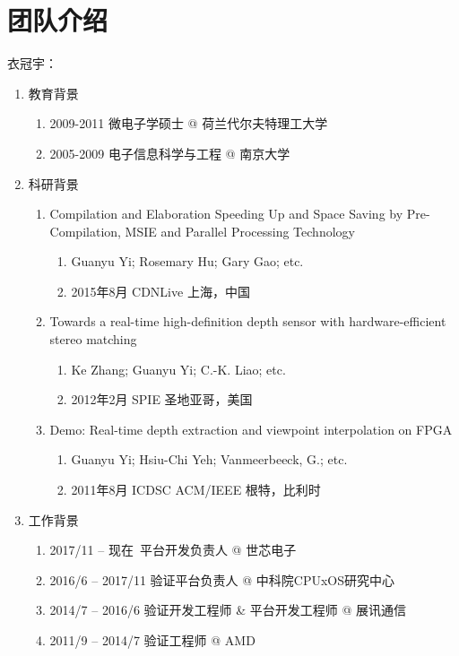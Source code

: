 \documentclass[a4paper,11pt]{article}
\begin{document}
\section{团队介绍}
衣冠宇：
\begin{enumerate}
\item 教育背景
  \begin{enumerate}
  \item 2009-2011 微电子学硕士 @ 荷兰代尔夫特理工大学
  \item 2005-2009 电子信息科学与工程 @ 南京大学
  \end{enumerate}
\item 科研背景
  \begin{enumerate}
  \item Compilation and Elaboration Speeding Up and Space Saving by Pre-Compilation, MSIE and Parallel Processing Technology
    \begin{enumerate}
    \item Guanyu Yi; Rosemary Hu; Gary Gao; etc.
    \item 2015年8月 CDNLive 上海，中国
    \end{enumerate}
  \item Towards a real-time high-definition depth sensor with hardware-efficient stereo matching
    \begin{enumerate}
    \item Ke Zhang; Guanyu Yi; C.-K. Liao; etc.
    \item 2012年2月 SPIE 圣地亚哥，美国
    \end{enumerate}
  \item Demo: Real-time depth extraction and viewpoint interpolation on FPGA
    \begin{enumerate}
    \item Guanyu Yi; Hsiu-Chi Yeh; Vanmeerbeeck, G.; etc.
    \item 2011年8月 ICDSC ACM/IEEE 根特，比利时
    \end{enumerate}
  \end{enumerate}
\item 工作背景
  \begin{enumerate}
  \item 2017/11 -- 现在~平台开发负责人 @ 世芯电子
  \item 2016/6 -- 2017/11 验证平台负责人 @ 中科院CPUxOS研究中心
  \item 2014/7 -- 2016/6 验证开发工程师 \& 平台开发工程师 @ 展讯通信
  \item 2011/9 -- 2014/7 验证工程师 @ AMD
  \end{enumerate}
\end{enumerate}
\end{document}
